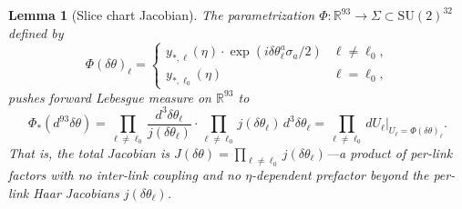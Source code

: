 \documentclass[11pt]{article}
\newtheorem{lemma}[theorem]{Lemma}
\theoremstyle{definition}
\newcommand{\SU}{\mathrm{SU}}
\newcommand{\R}{\mathbb{R}}
\begin{document}
\begin{lemma}[Slice chart Jacobian]%
\label{lem:slice-chart}
The parametrization
$\Phi:\R^{93}\to\Sigma\subset\SU(2)^{32}$ defined by
\[
\Phi(\delta\theta)_\ell=
\begin{cases}
y_{*,\ell}(\eta)\cdot\exp(i\delta\theta_\ell^a\sigma_a/2)
&\ell\ne\ell_0,\\
y_{*,\ell_0}(\eta) &\ell=\ell_0,
\end{cases}
\]
pushes forward Lebesgue measure on $\R^{93}$ to
\begin{equation}\label{eq:slice-jacobian}
\Phi_*(d^{93}\delta\theta)
=\prod_{\ell\ne\ell_0}
\frac{d^3\delta\theta_\ell}{j(\delta\theta_\ell)}
\cdot\prod_{\ell\ne\ell_0}j(\delta\theta_\ell)\,
d^3\delta\theta_\ell
=\prod_{\ell\ne\ell_0}dU_\ell\big|_{U_\ell=\Phi(\delta\theta)_\ell}.
\end{equation}
That is, the total Jacobian is
$J(\delta\theta)=\prod_{\ell\ne\ell_0}j(\delta\theta_\ell)$---a
\emph{product of per-link factors} with no inter-link coupling
and no $\eta$-dependent prefactor beyond the per-link Haar
Jacobians $j(\delta\theta_\ell)$.
\end{lemma}
\end{document}
